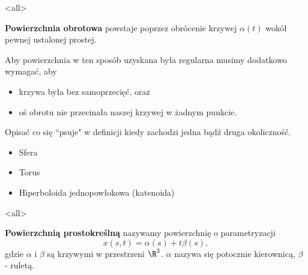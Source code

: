 \mode<all>{}
\begin{frame}[<+->]

\begin{definicja}
\textbf{Powierzchnia obrotowa} powstaje poprzez obrócenie krzywej $\alpha(t)$ wokół pewnej ustalonej prostej. 
\begin{center}

\end{center}
\end{definicja}


\end{frame}
\begin{frame}[<+->]


\begin{uwaga}
Aby powierzchnia w ten sposób uzyskana była regularna musimy dodatkowo wymagać, aby 
\begin{itemize}
\item krzywa była bez samoprzecięć, oraz
\item oś obrotu nie przecinała naszej krzywej w żadnym punkcie.
\end{itemize}

\begin{exercise}
Opisać co się ``psuje" w definicji kiedy zachodzi jedna bądź druga okoliczność.
\end{exercise}
\end{uwaga}

\end{frame}
\begin{frame}[<+->]

\begin{przyklad}
\begin{itemize}
\item Sfera
\item Torus
\begin{center}

\end{center}

\item Hiperboloida jednopowłokowa (katenoida)

\end{itemize}
\end{przyklad}

\end{frame}
\mode<all>{}
\begin{frame}[<+->]

\begin{definicja}
\textbf{Powierzchnią prostokreślną} nazywamy powierzchnię o parametryzacji\[x(s,t)=\alpha(s)+t\beta(s),\] gdzie $\alpha$ i $\beta$ są krzywymi w przestrzeni $\R^3$. $\alpha$ nazywa się potocznie kierownicą, $\beta$ - ruletą.

\begin{center}

\end{center}

\end{definicja}

\end{frame}
